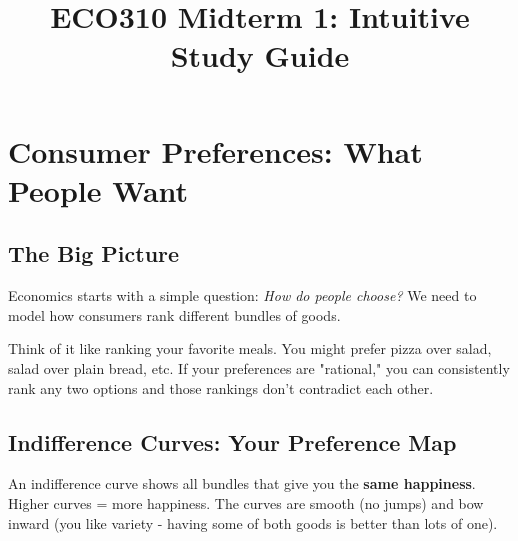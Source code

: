 \documentclass[11pt]{article}
\title{\textbf{ECO310 Midterm 1: Intuitive Study Guide}}
\date{}
\begin{document}
\maketitle

\section{Consumer Preferences: What People Want}

\subsection{The Big Picture}
Economics starts with a simple question: \textit{How do people choose?} We need to model how consumers rank different bundles of goods.

\begin{intuition}
Think of it like ranking your favorite meals. You might prefer pizza over salad, salad over plain bread, etc. If your preferences are "rational," you can consistently rank any two options and those rankings don't contradict each other.
\end{intuition}

\subsection{Indifference Curves: Your Preference Map}

\begin{center}
\end{center}

\begin{intuition}
An indifference curve shows all bundles that give you the \textbf{same happiness}. Higher curves = more happiness. The curves are smooth (no jumps) and bow inward (you like variety - having some of both goods is better than lots of one).
\end{intuition}
\end{document}
